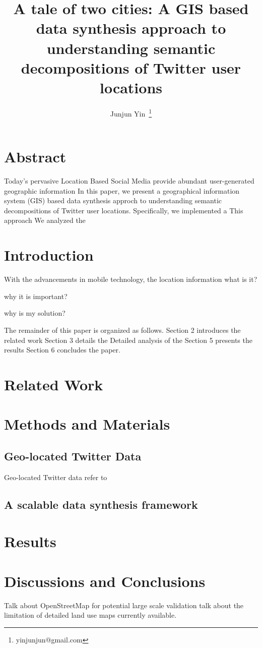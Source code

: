 \documentclass[a4paper,11pt]{article}
\begin{document}
\title{A tale of two cities: A GIS based data synthesis approach to understanding semantic decompositions of Twitter user locations}
\author{Junjun Yin~\thanks{yinjunjun@gmail.com}}
\renewcommand\Authands{ and }
\maketitle

\section*{Abstract}
Today's pervasive Location Based Social Media provide abundant user-generated geographic information
In this paper, we present a geographical information system (GIS) based data synthesis approch to understanding semantic decompositions of Twitter user locations.
Specifically, we implemented a
This approach 
We analyzed the 

\section{Introduction}
With the advancements in mobile technology, the location information 
what is it?

why it is important?

why is my solution?

The remainder of this paper is organized as follows. Section 2 introduces the related work 
Section 3 details the 
Detailed analysis of the
Section 5 presents the results
Section 6 concludes the paper.

\section{Related Work}



\section{Methods and Materials}
\subsection{Geo-located Twitter Data}
Geo-located Twitter data refer to  


\subsection{A scalable data synthesis framework}


\section{Results}


\section{Discussions and Conclusions}
Talk about OpenStreetMap for potential large scale validation
talk about the limitation of detailed land use maps currently available.





\end{document}
